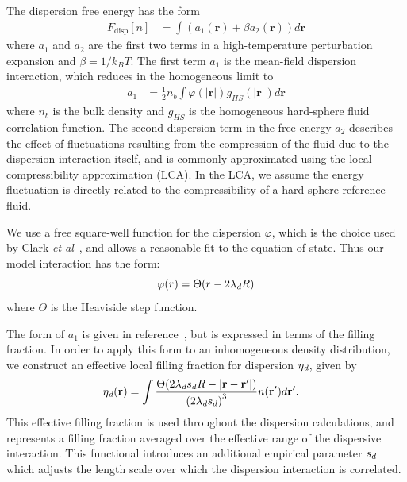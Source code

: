 \documentclass[letterpaper,twocolumn,amsmath,amssymb,prb]{revtex4-1}
\newcommand{\xx}{\textbf{r}}
\begin{document}
The dispersion free energy has the form~\cite{gil-villegas-1997-SAFT-VR}
\begin{align}
  F_\text{disp}[n] &= \int (a_1(\xx) + \beta a_2(\xx))d\xx
\end{align}
where $a_1$ and $a_2$ are the first two terms in a high-temperature
perturbation expansion and $\beta=1/k_BT$.  The first term $a_1$ is 
the mean-field dispersion
interaction, which reduces in the homogeneous limit to
\begin{align}\label{eq:A1-simple}
  a_1 &= \frac12 n_b \int \varphi(\left|\xx\right|)
  g_{HS}(\left|\xx\right|) d\xx
\end{align}
where $n_b$ is the bulk density and $g_{HS}$ is the homogeneous
hard-sphere fluid correlation function.
The second dispersion term in the free energy $a_2$ describes the
effect of fluctuations resulting from the compression of the fluid due
to the dispersion interaction itself, and is commonly approximated
using the local compressibility approximation (LCA). In the LCA,
we assume the energy fluctuation is directly related to the
compressibility of a hard-sphere reference fluid\cite{barker1976liquid}.

We use a free square-well function for the dispersion $\varphi$, which
is the choice used by Clark \emph{et al}~\cite{clark2006developing},
and allows a reasonable fit to the equation of state.  Thus our model
interaction has the form:
\begin{equation}
  \varphi(r) = \Theta(r-2 \lambda_\textit{d} R)
\end{equation}
where $\Theta$ is the Heaviside step function.

The form of $a_1$ is given in
reference~\cite{gil-villegas-1997-SAFT-VR}, but is expressed in terms
of the filling fraction.  In order to apply this form to an
inhomogeneous density distribution, we construct an effective local
filling fraction for dispersion $\eta_\textit{d}$, given by
\begin{align}
  \etadisp(\xx) &=
  \int \frac{\Theta(2\lambdadisp\lscale R - \left|\xx-\xx'\right|)}{
             \left(2\lambdadisp\lscale\right)^3} n(\xx') d\xx'.
\end{align}
This effective filling fraction is used throughout the dispersion
calculations, and represents a filling fraction averaged over the
effective range of the dispersive interaction.  This functional
introduces an additional empirical parameter $s_d$ which adjusts
the length scale over which the dispersion interaction is correlated.
\end{document}
